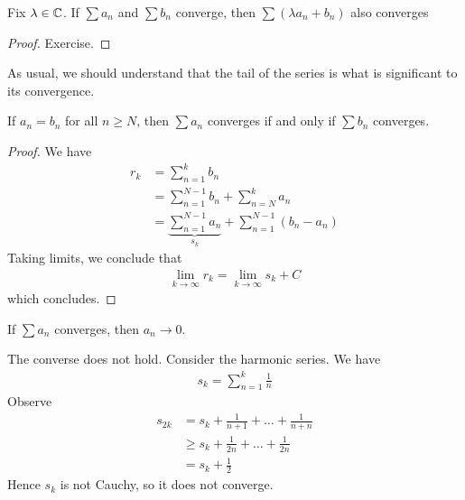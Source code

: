 \documentclass{../template/note}
\begin{document}
    \begin{lemma}
        Fix \(\lambda \in \mathbb C\). If \(\sum a_n\) and \(\sum b_n\) converge, then \(\sum(\lambda a_n + b_n)\) also converges
    \end{lemma}
    
    \begin{proof}
        Exercise.
    \end{proof}
    
    As usual, we should understand that the tail of the series is what is significant to its convergence.

    \begin{lemma}
        If \(a_n = b_n\) for all \(n \geq N\), then \(\sum a_n\) converges if and only if \(\sum b_n\) converges.
    \end{lemma}
    
    \begin{proof}
        We have
        \begin{align*}
            r_k &= \sum_{n=1}^k b_n \\
            &= \sum_{n=1}^{N-1} b_n + \sum_{n=N}^k a_n \\
            &= \underbrace{\sum_{n=1}^{N-1} a_n}_{s_k} + \sum_{n=1}^{N-1} (b_n-a_n)
        \end{align*}
        Taking limits, we conclude that
        \begin{align*}
            \lim_{k \to \infty} r_k = \lim_{k \to \infty} s_k + C
        \end{align*}
        which concludes.        
    \end{proof}
    
    \begin{proposition}
        If \(\sum a_n\) converges, then \(a_n \to 0\).
    \end{proposition}
    
    \begin{remark}
        The converse does not hold. Consider the harmonic series. We have
        \begin{align*}
            s_k = \sum_{n=1}^k \frac 1 n
        \end{align*}
        Observe
        \begin{align*}
            s_{2k} &= s_k + \frac{1}{n+1} + \dots + \frac{1}{n+n} \\
            &\geq s_k + \frac 1 {2n} + \dots + \frac 1 {2n} \\
            &= s_k + \frac{1}{2}
        \end{align*}
        Hence \(s_k\) is not Cauchy, so it does not converge.
    \end{remark}
    
\end{document}
